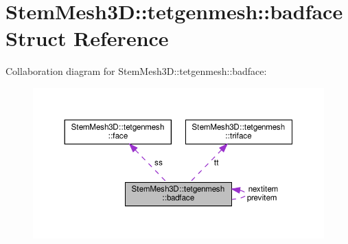 \hypertarget{structStemMesh3D_1_1tetgenmesh_1_1badface}{}\section{Stem\+Mesh3D\+:\+:tetgenmesh\+:\+:badface Struct Reference}
\label{structStemMesh3D_1_1tetgenmesh_1_1badface}


Collaboration diagram for Stem\+Mesh3D\+:\+:tetgenmesh\+:\+:badface\+:\nopagebreak
\begin{figure}[H]
\begin{center}
\leavevmode
\includegraphics[width=350pt]{structStemMesh3D_1_1tetgenmesh_1_1badface__coll__graph}
\end{center}
\end{figure}
